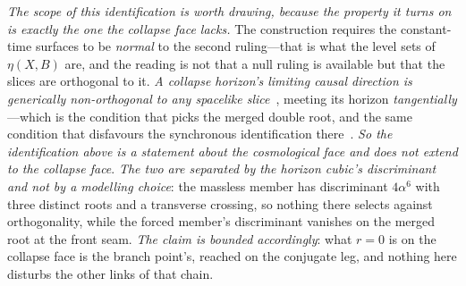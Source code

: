 \documentclass[11pt,a4paper]{article}
\theoremstyle{definition}
\begin{document}
\emph{The scope of this identification is worth drawing, because the property it turns on is exactly the
one the collapse face lacks.} The construction requires the constant-time surfaces to be \emph{normal} to the
second ruling---that is what the level sets of $\eta(X,B)$ are, and the reading is not that a null ruling is
available but that the slices are orthogonal to it. \emph{A collapse horizon's limiting causal direction is
generically non-orthogonal to any spacelike slice}~\cite{JanzenBHcausality}, meeting its horizon
\emph{tangentially}---which is the condition that picks the merged double root, and the same condition that
disfavours the synchronous identification there~\cite{JanzenCRframework}. \emph{So the identification above is
a statement about the cosmological face and does not extend to the collapse
face}. \emph{The two are separated by
the horizon cubic's discriminant and not by a modelling choice}: the massless member has discriminant
$4\alpha^{6}$ with three distinct roots and a transverse crossing, so nothing there selects against
orthogonality, while the forced member's discriminant vanishes on the merged root at the front seam. \emph{The
claim is bounded accordingly}: what $r=0$ is on the collapse face is the branch point's, reached on the
conjugate leg, and nothing here disturbs the other links of that chain.
\end{document}
